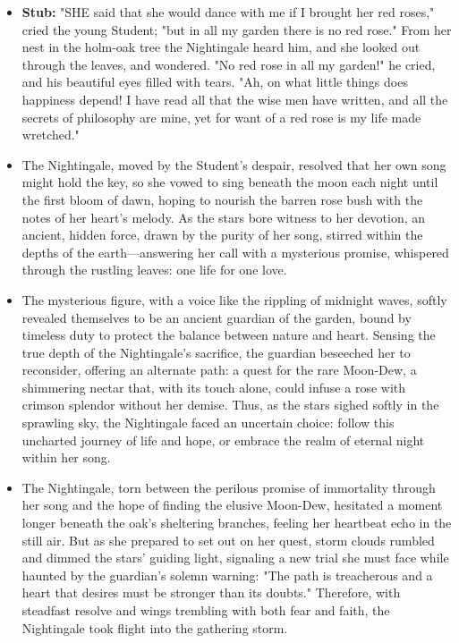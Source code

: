 \documentclass[11pt]{article}
\begin{document}
\begin{small}
\begin{itemize}
    \item \textbf{Stub:} "SHE said that she would dance with me if I brought her red roses," cried the young 
    Student; "but in all my garden there is no red rose." From her nest in the holm-oak tree the Nightingale 
    heard him, and she looked out through the leaves, and wondered. "No red rose in all my garden!" he cried, 
    and his beautiful eyes filled with tears. "Ah, on what little things does happiness depend! I have read 
    all that the wise men have written, and all the secrets of philosophy are mine, yet for want of a red rose 
    is my life made wretched."

    \item The Nightingale, moved by the Student's despair, resolved that her own song might hold the key, so 
    she vowed to sing beneath the moon each night until the first bloom of dawn, hoping to nourish the barren 
    rose bush with the notes of her heart's melody. As the stars bore witness to her devotion, an ancient, 
    hidden force, drawn by the purity of her song, stirred within the depths of the earth—answering her call 
    with a mysterious promise, whispered through the rustling leaves: one life for one love.

    \item The mysterious figure, with a voice like the rippling of midnight waves, softly revealed themselves 
    to be an ancient guardian of the garden, bound by timeless duty to protect the balance between nature and 
    heart. Sensing the true depth of the Nightingale's sacrifice, the guardian beseeched her to reconsider, 
    offering an alternate path: a quest for the rare Moon-Dew, a shimmering nectar that, with its touch alone, 
    could infuse a rose with crimson splendor without her demise. Thus, as the stars sighed softly in the 
    sprawling sky, the Nightingale faced an uncertain choice: follow this uncharted journey of life and hope, 
    or embrace the realm of eternal night within her song.

    \item The Nightingale, torn between the perilous promise of immortality through her song and the hope of 
    finding the elusive Moon-Dew, hesitated a moment longer beneath the oak's sheltering branches, feeling 
    her heartbeat echo in the still air. But as she prepared to set out on her quest, storm clouds rumbled 
    and dimmed the stars' guiding light, signaling a new trial she must face while haunted by the guardian's 
    solemn warning: "The path is treacherous and a heart that desires must be stronger than its doubts." 
    Therefore, with steadfast resolve and wings trembling with both fear and faith, the Nightingale took 
    flight into the gathering storm.


\end{itemize}
\end{small}
\end{document}
